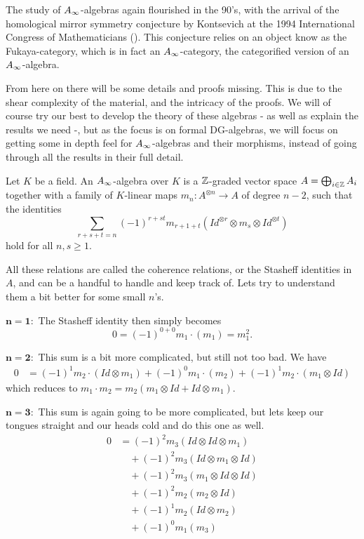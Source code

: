 The study of $\A$-algebras again flourished in the 90's, with the arrival of the homological mirror symmetry conjecture by Kontsevich at the 1994 International Congress of Mathematicians (\cite{kontsevich}). This conjecture relies on an object know as the Fukaya-category, which is in fact an $\A$-category, the categorified version of an $\A$-algebra.

From here on there will be some details and proofs missing. This is due to the shear complexity of the material, and the intricacy of the proofs. We will of course try our best to develop the theory of these algebras - as well as explain the results we need -, but as the focus is on formal DG-algebras, we will focus on getting some in depth feel for $\A$-algebras and their morphisms, instead of going through all the results in their full detail.   

\begin{definition}[$\A$-algebra]
    Let $K$ be a field. An $\A$-algebra over $K$ is a $\mathbb{Z}$-graded vector space $A=\bigoplus_{i\in \mathbb{Z}}A_i$ together with a family of $K$-linear maps $m_n : A^{\otimes n}\rightarrow A$ of degree $n-2$, such that the identities 
    \begin{equation*}
        \sum_{r+s+t = n}(-1)^{r+st}m_{r+1+t}(Id^{\otimes r}\otimes m_s \otimes Id^{\otimes t})
    \end{equation*}
    hold for all $n, s\geq 1$. 
\end{definition}

All these relations are called the coherence relations, or the Stasheff identities in $A$, and can be a handful to handle and keep track of. Lets try to understand them a bit better for some small $n$'s. 

$\mathbf{n=1 :}$ The Stasheff identity then simply becomes
\begin{equation*}
    0 = (-1)^{0+0}m_1 \cdot (m_1) = m_1^2 .
\end{equation*}

$\mathbf{n=2 :}$ This sum is a bit more complicated, but still not too bad. We have
\begin{align*}
    0 
    &= (-1)^{1}m_2\cdot(Id\otimes m_1)+(-1)^{0}m_1\cdot (m_2)+(-1)^{1}m_2\cdot (m_1\otimes Id)
\end{align*}
which reduces to $m_1 \cdot m_2 = m_2(m_1\otimes Id + Id\otimes m_1)$. 

$\mathbf{n=3 :}$ This sum is again going to be more complicated, but lets keep our tongues straight and our heads cold and do this one as well. 
\begin{align*}
    0 
    &= (-1)^{2}m_3(Id\otimes Id \otimes m_1) \\
    &\quad + (-1)^{2}m_3(Id\otimes m_1 \otimes Id) \\
    &\quad + (-1)^{2}m_3(m_1\otimes Id \otimes Id) \\
    &\quad + (-1)^{2}m_2(m_2\otimes Id) \\
    &\quad + (-1)^{1}m_2(Id\otimes m_2) \\
    &\quad + (-1)^{0}m_1(m_3) 
\end{align*}

